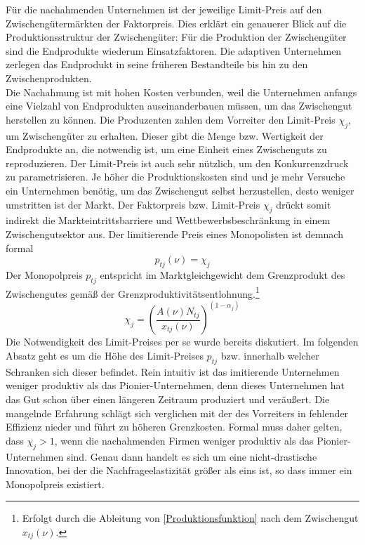 Für die nachahmenden Unternehmen ist der jeweilige Limit-Preis auf den Zwischengütermärkten der Faktorpreis. Dies erklärt ein genauerer Blick auf die Produktionsstruktur der Zwischengüter: Für die Produktion der Zwischengüter sind die Endprodukte wiederum Einsatzfaktoren. Die adaptiven Unternehmen zerlegen das Endprodukt in seine früheren Bestandteile bis hin zu den Zwischenprodukten. \\
%
Die Nachahmung ist mit hohen Kosten verbunden, weil die Unternehmen anfangs eine Vielzahl von Endprodukten auseinanderbauen müssen, um das Zwischengut herstellen zu können. Die Produzenten zahlen dem Vorreiter den Limit-Preis $\chi_j$, um Zwischengüter zu erhalten. Dieser gibt die Menge bzw. Wertigkeit der Endprodukte an, die notwendig ist, um eine Einheit eines Zwischenguts zu reproduzieren. Der Limit-Preis ist auch sehr nützlich, um den Konkurrenzdruck zu parametrisieren. Je höher die Produktionskosten sind und je mehr Versuche ein Unternehmen benötig, um das Zwischengut selbst herzustellen, desto weniger umstritten ist der Markt. Der Faktorpreis bzw. Limit-Preis $\chi_j$ drückt somit indirekt die Markteintrittsbarriere und Wettbewerbsbeschränkung in einem Zwischengutsektor aus. Der limitierende Preis eines Monopolisten ist demnach formal 
%
	\begin{equation}
		p_{tj}(\nu)=\chi_j \label{Grenzproduktentlohnung}
	\end{equation}
%
Der Monopolpreis $p_{tj}$ entspricht im Marktgleichgewicht dem Grenzprodukt des Zwischengutes gemäß der Grenzproduktivitätsentlohnung.\footnote{Erfolgt durch die Ableitung von \eqref{Produktionsfunktion} nach dem Zwischengut $x_{tj}(\nu)$.}
%
	\begin{equation}
		\chi_j=\left(\frac{A(\nu)N_{tj}}{x_{tj}(\nu)}\right)^{(1-\alpha_j)}
	\end{equation}
%
Die Notwendigkeit des Limit-Preises per se wurde bereits diskutiert. Im folgenden Absatz geht es um die Höhe des Limit-Preises $p_{tj}$  bzw. innerhalb welcher Schranken sich dieser befindet. Rein intuitiv ist das imitierende Unternehmen weniger produktiv als das Pionier-Unternehmen, denn dieses Unternehmen  hat das Gut schon über einen längeren Zeitraum produziert und veräußert. Die mangelnde Erfahrung schlägt sich verglichen mit der des Vorreiters in fehlender Effizienz nieder und führt zu höheren Grenzkosten. Formal muss daher gelten, dass $\chi_j>1$, wenn die nachahmenden Firmen weniger produktiv  als das Pionier-Unternehmen sind. Genau dann handelt es sich um eine nicht-drastische Innovation, bei der die Nachfrageelastizität größer als eins ist, so dass immer ein Monopolpreis existiert.\\
